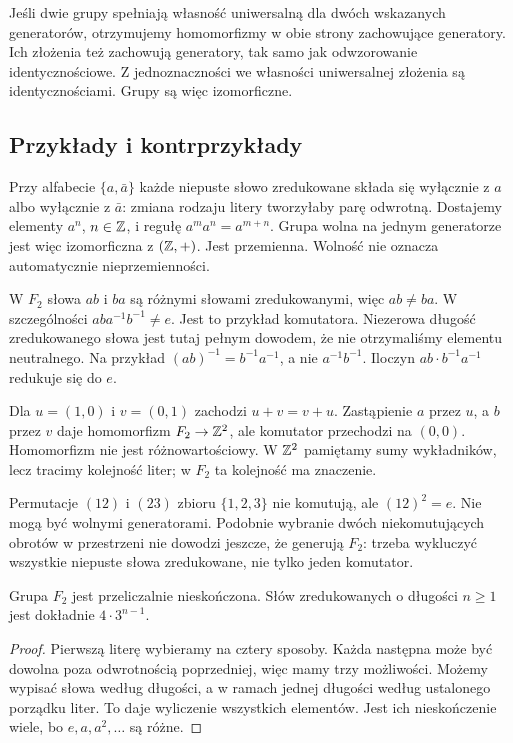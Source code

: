\begin{uwaga}
Jeśli dwie grupy spełniają własność uniwersalną dla dwóch wskazanych generatorów, otrzymujemy homomorfizmy w obie strony zachowujące generatory. Ich złożenia też zachowują generatory, tak samo jak odwzorowanie identycznościowe. Z jednoznaczności we własności uniwersalnej złożenia są identycznościami. Grupy są więc izomorficzne.
\end{uwaga}

\subsection{Przykłady i kontrprzykłady}
\begin{przyklad}
Przy alfabecie $\{a,\bar a\}$ każde niepuste słowo zredukowane składa się wyłącznie z $a$ albo wyłącznie z $\bar a$: zmiana rodzaju litery tworzyłaby parę odwrotną. Dostajemy elementy $a^n$, $n\in\mathbb Z$, i regułę $a^ma^n=a^{m+n}$. Grupa wolna na jednym generatorze jest więc izomorficzna z $(\mathbb Z,+)$. Jest przemienna. Wolność nie oznacza automatycznie nieprzemienności.
\end{przyklad}
\begin{przyklad}
W $F_2$ słowa $ab$ i $ba$ są różnymi słowami zredukowanymi, więc $ab\ne ba$. W szczególności $aba^{-1}b^{-1}\ne e$. Jest to przykład komutatora. Niezerowa długość zredukowanego słowa jest tutaj pełnym dowodem, że nie otrzymaliśmy elementu neutralnego. Na przykład $(ab)^{-1}=b^{-1}a^{-1}$, a nie $a^{-1}b^{-1}$. Iloczyn $ab\cdot b^{-1}a^{-1}$ redukuje się do $e$.
\end{przyklad}
\begin{przyklad}
Dla $u=(1,0)$ i $v=(0,1)$ zachodzi $u+v=v+u$. Zastąpienie $a$ przez $u$, a $b$ przez $v$ daje homomorfizm $F_2\to\mathbb Z^2$, ale komutator przechodzi na $(0,0)$. Homomorfizm nie jest różnowartościowy. W $\mathbb Z^2$ pamiętamy sumy wykładników, lecz tracimy kolejność liter; w $F_2$ ta kolejność ma znaczenie.
\end{przyklad}
\begin{przyklad}
Permutacje $(12)$ i $(23)$ zbioru $\{1,2,3\}$ nie komutują, ale $(12)^2=e$. Nie mogą być wolnymi generatorami. Podobnie wybranie dwóch niekomutujących obrotów w przestrzeni nie dowodzi jeszcze, że generują $F_2$: trzeba wykluczyć wszystkie niepuste słowa zredukowane, nie tylko jeden komutator.
\end{przyklad}
\begin{stwierdzenie}[Przeliczalność]\label{st:przeliczalnosc-f2}
Grupa $F_2$ jest przeliczalnie nieskończona. Słów zredukowanych o długości $n\ge1$ jest dokładnie $4\cdot3^{n-1}$.
\end{stwierdzenie}
\begin{proof}
Pierwszą literę wybieramy na cztery sposoby. Każda następna może być dowolna poza odwrotnością poprzedniej, więc mamy trzy możliwości. Możemy wypisać słowa według długości, a w ramach jednej długości według ustalonego porządku liter. To daje wyliczenie wszystkich elementów. Jest ich nieskończenie wiele, bo $e,a,a^2,\ldots$ są różne.
\end{proof}

